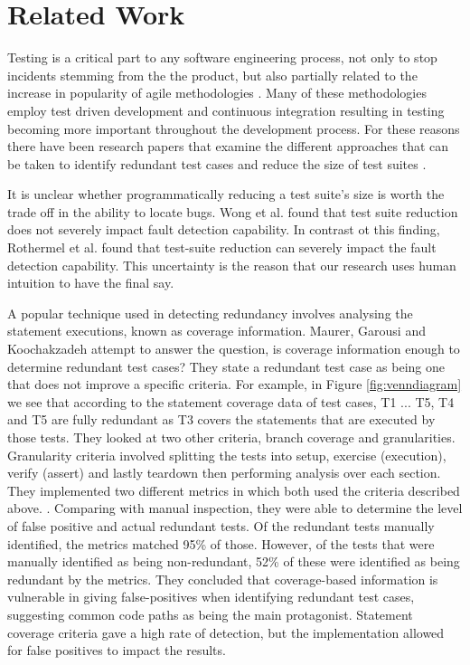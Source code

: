 \chapter{Related Work}\label{C:related}

Testing is a critical part to any software engineering process, not only to stop incidents stemming from the the product, but also partially related to the increase in popularity of agile methodologies \cite{chaos}. Many of these methodologies employ test driven development and continuous integration resulting in testing becoming more important throughout the development process. For these reasons there have been research papers that examine the different approaches that can be taken to identify redundant test cases and reduce the size of test suites \cite{wong1995effect, wong1999test, rothermel1998empirical, rothermel2002empirical,koochakzadeh2009test,zhang2011empirical,li2008static}.

It is unclear whether programmatically reducing a test suite's size is worth the trade off in the ability to locate bugs.  Wong et al. \cite{wong1995effect, wong1999test} found that test suite reduction does not severely impact fault detection capability. In contrast ot this finding, Rothermel et al. \cite{rothermel1998empirical, rothermel2002empirical} found that test-suite reduction can severely impact the fault detection capability. This uncertainty is the reason that our research uses human intuition to have the final say.

A popular technique used in detecting redundancy involves analysing the statement executions, known as coverage information. Maurer, Garousi and Koochakzadeh \cite{koochakzadeh2009test} attempt to answer the question, is coverage information enough to determine redundant test cases? They state a redundant test case as being one that does not improve a specific criteria. For example, in Figure \ref{fig:venndiagram} we see that according to the statement coverage data of test cases, T1 ... T5, T4 and T5 are fully redundant as T3 covers the statements that are executed by those tests. They looked at two other criteria, branch coverage and granularities. Granularity criteria involved splitting the tests into setup, exercise (execution), verify (assert) and lastly teardown then performing analysis over each section. They implemented two different metrics in which both used the criteria described above. . Comparing with manual inspection, they were able to determine the level of false positive and actual redundant tests. Of the redundant tests manually identified, the metrics matched 95\% of those. However, of the tests that were manually identified as being non-redundant, 52\% of these were identified as being redundant by the metrics. They concluded that coverage-based information is vulnerable in giving false-positives when identifying redundant test cases, suggesting common code paths as being the main protagonist.  Statement coverage criteria gave a high rate of detection, but the implementation allowed for false positives to impact the results. 

